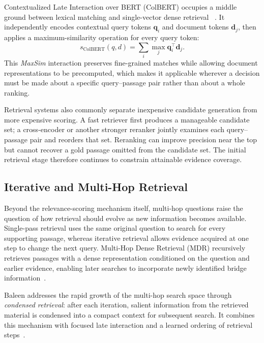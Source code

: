 Contextualized Late Interaction over BERT (ColBERT) occupies a middle ground
between lexical matching and single-vector dense retrieval
~\cite{khattab2020colbert}. It independently encodes contextual
query tokens \(\mathbf{q}_i\) and document tokens \(\mathbf{d}_j\), then applies
a maximum-similarity operation for every query token:
\begin{equation}
  s_{\mathrm{ColBERT}}(q,d)
  =\sum_i\max_j\mathbf{q}_i^{\top}\mathbf{d}_j.
  \label{eq:colbert}
\end{equation}
This \emph{MaxSim} interaction preserves fine-grained matches while allowing
document representations to be precomputed, which makes it applicable wherever
a decision must be made about a specific query--passage pair rather than about
a whole ranking.

Retrieval systems also commonly separate inexpensive candidate generation from
more expensive scoring. A fast retriever first produces a manageable candidate
set; a cross-encoder or another stronger reranker jointly examines each
query--passage pair and reorders that set. Reranking can improve precision near
the top but cannot recover a gold passage omitted from the candidate set. The
initial retrieval stage therefore continues to constrain attainable evidence
coverage.

\subsection{Iterative and Multi-Hop Retrieval}
\label{subsec:iterative-retrieval}

Beyond the relevance-scoring mechanism itself, multi-hop questions raise the
question of how retrieval should evolve as new information becomes available.
Single-pass retrieval uses the same original question to search for every
supporting passage, whereas iterative retrieval allows evidence acquired at one
step to change the next query. Multi-Hop Dense Retrieval (MDR) recursively
retrieves passages with a dense representation conditioned on the question and
earlier evidence, enabling later searches to incorporate newly identified bridge
information~\cite{xiong2021mdr}.

Baleen addresses the rapid growth of the multi-hop search space through
\emph{condensed retrieval}: after each iteration, salient information from the
retrieved material is condensed into a compact context for subsequent search.
It combines this mechanism with focused late interaction and a learned ordering
of retrieval steps~\cite{khattab2021baleen}.


